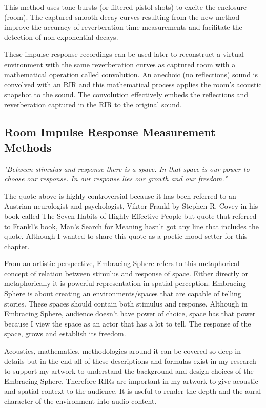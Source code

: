             This method uses tone bursts (or filtered pistol shots) to excite the enclosure (room). The captured smooth decay curves resulting from the new method improve the accuracy of reverberation time measurements and facilitate the detection of non-exponential decays\cite{New_Method_Measuring_RT}.\par

            These impulse response recordings can be used later to reconstruct a virtual environment with the same reverberation curves as captured room with a mathematical operation called convolution. An anechoic (no reflections) sound is convolved with an RIR and this mathematical process applies the room's acoustic snapshot to the sound. The convolution effectively embeds the reflections and reverberation captured in the RIR to the original sound.\par
        \subsection{Room Impulse Response Measurement Methods}
            \emph{"Between stimulus and response there is a space. In that space is our power to choose our response. In our response lies our growth and our freedom."\cite{Sonic_Interaction_in_Virtual_Environments}}

            The quote above is highly controversial because it has been referred to an Austrian neurologist and psychologist, Viktor Frankl by Stephen R. Covey in his book called The Seven Habits of Highly Effective People but quote that referred to Frankl's book, Man’s Search for Meaning hasn't got any line that includes the quote. Although I wanted to share this quote as a poetic mood setter for this chapter.\par

            From an artistic perspective, Embracing Sphere refers to this metaphorical concept of relation between stimulus and response of space. Either directly or metaphorically it is powerful representation in spatial perception. Embracing Sphere is about creating an environments/spaces that are capable of telling stories. These spaces should contain both stimulus and response. Although in Embracing Sphere, audience doesn't have power of choice, space has that power because I view the space as an actor that has a lot to tell. The response of the space, grows and establish its freedom.\par

            Acoustics, mathematics, methodologies around it can be covered so deep in details but in the end all of these descriptions and formulas exist in my research to support my artwork to understand the background and design choices of the Embracing Sphere. Therefore RIRs are important in my artwork to give acoustic and spatial context to the audience. It is useful to render the depth and the aural character of the environment into audio content.\par

